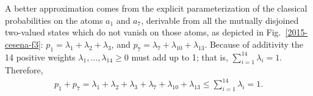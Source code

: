 \documentclass[%
  twocolumn,
 showpacs,
 showkeys,
 preprintnumbers,
 amsmath,amssymb,
 aps,
  pra,
  longbibliography,
 floatfix,
 ]{revtex4-1}
\begin{document}
A better approximation comes from the explicit parameterization of the classical probabilities on the atoms $a_1$ and $a_7$,
derivable from all the mutually disjoined two-valued states which do not vanish on those atoms,
as depicted in Fig.~\ref{2015-cesena-f3}:
$p_1= \lambda_1 + \lambda_2 + \lambda_3$, and
$p_7= \lambda_7 + \lambda_{10} + \lambda_{13}$.
Because of additivity the 14 positive weights $\lambda_{1},\ldots ,\lambda_{14} \ge 0$
must add up to 1; that is, $\sum_{i=1}^{14} \lambda_{i}=1$.
Therefore,
\begin{equation}
\begin{split}
p_{1} + p_{7}
= \lambda_1 + \lambda_2 + \lambda_3 + \lambda_7 + \lambda_{10} + \lambda_{13}
\le \sum_{i=1}^{14} \lambda_{i}=1
.
\end{split}
\label{2017-b-spbp17}
\end{equation}
\end{document}
